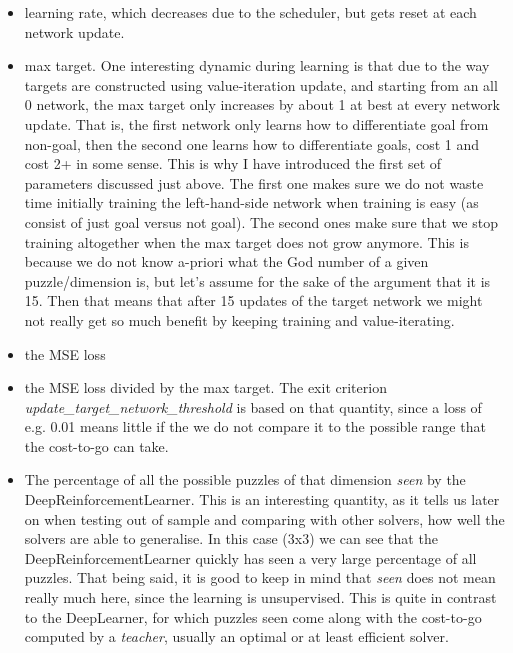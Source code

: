 \begin{itemize}
\item learning rate, which decreases due to the scheduler, but gets reset at each network update.
\item max target. One interesting dynamic during learning is that due to the way targets are constructed using value-iteration update, and starting from an all 0 network, the max target only increases by about 1 at best at every network update. That is, the first network only learns how to differentiate goal from non-goal, then the second one learns how to differentiate goals, cost 1 and cost 2+ in some sense. This is why I have introduced the first set of parameters discussed just above. The first one makes sure we do not waste time initially training the left-hand-side network when training is easy (as consist of just goal versus not goal). The second ones make sure that we stop training altogether when the max target does not grow anymore. This is because we do not know a-priori what the God number of a given puzzle/dimension is, but let's assume for the sake of the argument that it is 15. Then that means that after 15 updates of the target network we might not really get so much benefit by keeping training and value-iterating.
\item the MSE loss
\item the MSE loss divided by the max target. The exit criterion \textit{update\_target\_network\_threshold} is based on that quantity, since a loss of e.g. 0.01 means little if the we do not compare it to the possible range that the cost-to-go can take.
\item The percentage of all the possible puzzles of that dimension \textit{seen} by the DeepReinforcementLearner. This is an interesting quantity, as it tells us later on when testing out of sample and comparing with other solvers, how well the solvers are able to generalise. In this case (3x3) we can see that the DeepReinforcementLearner quickly has seen a very large percentage of all puzzles. That being said, it is good to keep in mind that \textit{seen} does not mean really much here, since the learning is unsupervised. This is quite in contrast to the DeepLearner, for which puzzles seen come along with the cost-to-go computed by a \textit{teacher}, usually an optimal or at least efficient solver.
\end{itemize}


